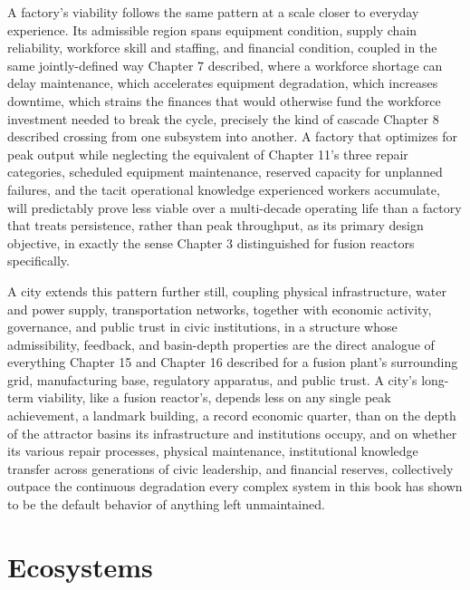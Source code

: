 A factory's viability follows the same pattern at a scale closer to everyday experience. Its admissible region spans equipment condition, supply chain reliability, workforce skill and staffing, and financial condition, coupled in the same jointly-defined way Chapter 7 described, where a workforce shortage can delay maintenance, which accelerates equipment degradation, which increases downtime, which strains the finances that would otherwise fund the workforce investment needed to break the cycle, precisely the kind of cascade Chapter 8 described crossing from one subsystem into another. A factory that optimizes for peak output while neglecting the equivalent of Chapter 11's three repair categories, scheduled equipment maintenance, reserved capacity for unplanned failures, and the tacit operational knowledge experienced workers accumulate, will predictably prove less viable over a multi-decade operating life than a factory that treats persistence, rather than peak throughput, as its primary design objective, in exactly the sense Chapter 3 distinguished for fusion reactors specifically.

A city extends this pattern further still, coupling physical infrastructure, water and power supply, transportation networks, together with economic activity, governance, and public trust in civic institutions, in a structure whose admissibility, feedback, and basin-depth properties are the direct analogue of everything Chapter 15 and Chapter 16 described for a fusion plant's surrounding grid, manufacturing base, regulatory apparatus, and public trust. A city's long-term viability, like a fusion reactor's, depends less on any single peak achievement, a landmark building, a record economic quarter, than on the depth of the attractor basins its infrastructure and institutions occupy, and on whether its various repair processes, physical maintenance, institutional knowledge transfer across generations of civic leadership, and financial reserves, collectively outpace the continuous degradation every complex system in this book has shown to be the default behavior of anything left unmaintained.

\section{Ecosystems}

